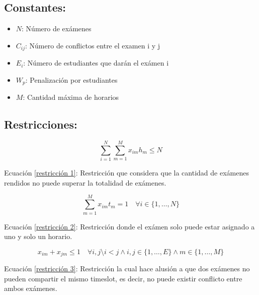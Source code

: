 \subsection{Constantes:}

\begin{itemize}
    \item $N$: Número de exámenes
    \item  $C_{ij}$: Número de conflictos entre el examen i y j
    \item $E_{i}$: Número de estudiantes que darán el exámen i
    \item $W_{p}$: Penalización por estudiantes
    \item $M$: Cantidad máxima de horarios
\end{itemize}

\subsection{Restricciones:}
\begin{equation}
    \label{restricción 1}
    \sum_{i=1}^N \sum_{m=1}^M x_{im}h_{m} \leq N
\end{equation}
\begin{center}
    Ecuación \ref{restricción 1}: Restricción que considera que la cantidad de exámenes rendidos no puede superar la totalidad de exámenes.
\end{center}
\vspace{5mm}
\begin{equation}
    \label{restricción 2}
    \sum_{m=1}^M x_{im}t_{m} = 1 \quad \forall i \in \{1, \ldots, N\}
\end{equation}
\begin{center}
    Ecuación \ref{restricción 2}: Restricción donde el exámen solo puede estar asignado a uno y solo un horario.
\end{center}
\vspace{5mm}
\begin{equation}
    \label{restricción 3}
    x_{im} + x_{jm} \leq 1 \quad \forall i,j \setminus i<j \wedge i,j \in \{1, \ldots, E\} \wedge m \in \{1, \ldots, M\}
\end{equation}
\begin{center}
    Ecuación \ref{restricción 3}: Restricción la cual hace alusión a que dos exámenes no pueden compartir el mismo timeslot, es decir, no puede existir conflicto entre ambos exámenes.
\end{center}

